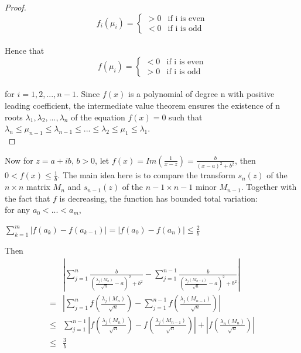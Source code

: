 \documentclass{article}
\begin{document}
\begin{proof}
\[ f_i(\mu_i) = \begin{cases} 
      >0 & \text{if i is even} \\
      <0 & \text{if i is odd}
   \end{cases}
\]
\\
Hence that \\
\[ f(\mu_i) = \begin{cases} 
      <0 & \text{if i is even} \\
      >0 & \text{if i is odd}
   \end{cases}
\]
\\
for $i = 1, 2, ..., n-1$. Since $f(x)$ is a polynomial of degree n with positive leading coefficient, the intermediate value theorem ensures the existence of n roots $\lambda_1, \lambda_2,..., \lambda_n$ of the equation $f(x) = 0$ such that $\lambda_n \leq \mu_{n-1} \leq \lambda_{n-1} \leq ... \leq \lambda_2 \leq \mu_1 \leq \lambda_1$.\\
\end{proof}
\noindent Now for $z = a + ib$, $b > 0$, let $f(x) = Im\left(\frac{1}{x - z}\right) = \frac{b}{(x-a)^2 + b^2}$, then $0 < f(x) \leq \frac{1}{b}$. The main idea here is to compare the transform $s_n(z)$ of the $n \times n$ matrix $M_n$ and $s_{n-1}(z)$ of the $n-1 \times n-1$ minor $M_{n-1}$. Together with the fact that $f$ is decreasing, the function has bounded total variation:\\
for any $a_0 < ... < a_m$, 
\begin{center}
    $\sum\limits_{k=1}^m \left| f(a_k) - f(a_{k-1})\right| = \left| f(a_0) - f(a_{n})\right| \leq \frac{2}{b}$
\end{center}
Then
    \begin{align*}
         & \left| \sum\limits_{j = 1}^n \frac{b}{\left(\frac{\lambda_j (M_n)}{\sqrt{n}} - a \right)^2 + b^2} - \sum\limits_{j = 1}^{n-1} \frac{b}{ \left(\frac{\lambda_j( M_{n-1})}{\sqrt{n}} - a\right)^2 + b^2}
        \right|\\
        =&\left| \sum\limits_{j = 1}^n f \left(\frac{\lambda_j(M_n)}{\sqrt{n}} \right) - \sum\limits_{j = 1}^{n-1} f \left(\frac{\lambda_j(M_{n-1})}{\sqrt{n}} \right)
        \right| \\
        \leq &\sum\limits_{j = 1}^{n-1} \left|f \left(\frac{\lambda_j(M_n)}{\sqrt{n}} \right) - f \left(\frac{\lambda_j(M_{n-1})}{\sqrt{n}} \right)
        \right| + \left| f \left(\frac{\lambda_n(M_n)}{\sqrt{n}} \right) \right| \\
        \leq &\frac{3}{b}
    \end{align*}
\end{document}
